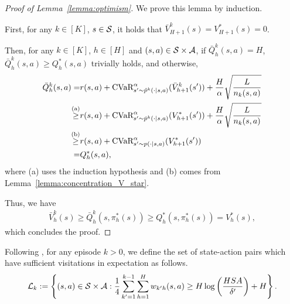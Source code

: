 \begin{proof}[Proof of Lemma~\ref{lemma:optimism}]
	We prove this lemma by induction.
	
	First, for any $k \in [K]$, $s \in \mathcal{S}$, it holds that $\bar{V}^k_{H+1}(s) = V^{*}_{H+1}(s)=0$.
	
	Then, for any $k \in [K]$, $h \in [H]$ and $(s,a) \in \mathcal{S} \times \mathcal{A}$, if $\bar{Q}^k_h(s,a)=H$, $\bar{Q}^k_h(s,a) \geq Q^{*}_h(s,a)$ trivially holds, and otherwise,
	\begin{align*}
		\bar{Q}^k_h(s,a) = & r(s,a)+\textup{CVaR}^{\alpha}_{s' \sim \hat{p}^k(\cdot|s,a)}(\bar{V}^k_{h+1}(s')) + \frac{H}{\alpha}\sqrt{\frac{L}{n_k(s,a)}}
		\\
		\overset{\textup{(a)}}{\geq} & r(s,a)+\textup{CVaR}^{\alpha}_{s' \sim \hat{p}^k(\cdot|s,a)}(V^{*}_{h+1}(s')) + \frac{H}{\alpha}\sqrt{\frac{L}{n_k(s,a)}}
		\\
		\overset{\textup{(b)}}{\geq} & r(s,a)+\textup{CVaR}^{\alpha}_{s' \sim p(\cdot|s,a)}(V^{*}_{h+1}(s'))
		\\
		= & Q^{*}_h(s,a) ,
	\end{align*}
	where (a) uses the induction hypothesis and (b) comes from Lemma~\ref{lemma:concentration_V_star}.
	
	Thus, we have
	\begin{align*}
		\bar{V}^k_h(s) \geq \bar{Q}^k_h(s,\pi^{*}_h(s)) \geq Q^{*}_h(s,\pi^{*}_h(s)) = V^{*}_h(s) ,
	\end{align*}
	which concludes the proof.
\end{proof}



Following \citep{zanette2019tighter}, for any episode $k>0$, we define the set of state-action pairs which have sufficient visitations in expectation as follows.
\begin{align}
	\mathcal{L}_k := \left\{  (s,a) \in \mathcal{S} \times \mathcal{A}: \frac{1}{4} \sum_{k'=1}^{k-1} \sum_{h=1}^{H} w_{k'h}(s,a) \geq H \log \left( \frac{HSA}{\delta'} \right) +H  \right\} .  \label{eq:definition_cL_k}
\end{align}

